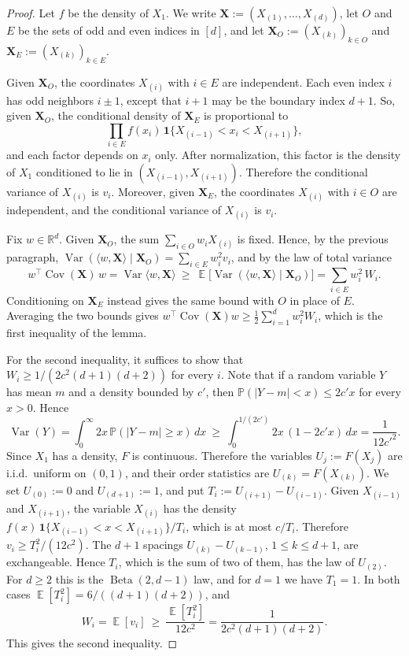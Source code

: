 \documentclass[11pt]{article}
\newcommand{\R}{\mathbb{R}}
\newcommand{\inner}[2]{\langle #1, #2 \rangle}
\theoremstyle{definition}
\DeclareMathOperator{\EX}{\mathbb{E}}
\DeclareMathOperator{\Cov}{Cov}
\begin{document}
\begin{proof}
	Let $f$ be the density of $X_1$. We write $\mathbf X:=(X_{(1)},\dots,X_{(d)})$, let $O$ and
	$E$ be the sets of odd and even indices in $[d]$, and let
	$\mathbf X_O:=(X_{(k)})_{k\in O}$ and $\mathbf X_E:=(X_{(k)})_{k\in E}$.

	Given $\mathbf X_O$, the coordinates $X_{(i)}$ with $i\in E$ are independent.  Each even index $i$
has odd neighbors $i\pm1$, except that $i+1$ may be the boundary index $d+1$. So,
given $\mathbf X_O$, the conditional density of $\mathbf X_E$ is proportional to
\[
\prod_{i\in E} f(x_i)\,\mathbf 1\bigl\{X_{(i-1)}<x_i<X_{(i+1)}\bigr\},
\]
and each factor depends on $x_i$ only. After normalization, this factor is
the density of $X_1$ conditioned to lie in $(X_{(i-1)},X_{(i+1)})$. Therefore the conditional variance of $X_{(i)}$ is $v_i$. Moreover, given $\mathbf X_E$, the coordinates $X_{(i)}$ with $i\in O$ are
independent, and the conditional variance of $X_{(i)}$ is $v_i$.

	 Fix $w\in\R^d$. Given $\mathbf X_O$, the sum
	$\sum_{i\in O}w_iX_{(i)}$ is fixed. Hence, by the previous paragraph,
	$\operatorname{Var}(\inner{w}{\mathbf X}\mid\mathbf X_O)=\sum_{i\in E}w_i^2v_i$, and by
	the law of total variance
	\[
	w^{\!\top}\Cov(\mathbf X)\,w=\operatorname{Var}\inner{w}{\mathbf X}
	\ \ge\ \EX\bigl[\operatorname{Var}(\inner{w}{\mathbf X}\mid \mathbf X_O)\bigr]
	=\sum_{i\in E}w_i^2\,W_i .
	\]
	Conditioning on $\mathbf X_E$ instead gives the same bound with $O$ in place of $E$.
	Averaging the two bounds gives
	$w^{\!\top}\Cov(\mathbf X)w\ge\tfrac12\sum_{i=1}^dw_i^2W_i$, which is the first
	inequality of the lemma.

	For the second inequality, it suffices to show that $W_i\ge1/(2c^2(d+1)(d+2))$ for
every $i$. Note that if a random variable $Y$ has mean $m$ and a density
bounded by $c'$, then $\mathbb P(|Y-m|<x)\le2c'x$ for every $x>0$. Hence
\[
\operatorname{Var}(Y)=\int_0^\infty2x\,\mathbb P(|Y-m|\ge x)\,dx
\ \ge\ \int_0^{1/(2c')}2x\,(1-2c'x)\,dx=\frac{1}{12c'^2}.
\]
Since $X_1$ has a density, $F$ is continuous. Therefore the variables $U_j:=F(X_j)$ are i.i.d.\
uniform on $(0,1)$, and their order statistics are $U_{(k)}=F(X_{(k)})$. We set
$U_{(0)}:=0$ and $U_{(d+1)}:=1$, and put $T_i:=U_{(i+1)}-U_{(i-1)}$. Given $X_{(i-1)}$ and
$X_{(i+1)}$, the variable $X_{(i)}$ has the density
$f(x)\,\mathbf 1\{X_{(i-1)}<x<X_{(i+1)}\}/T_i$, which is at most $c/T_i$. Therefore
$v_i\ge T_i^2/(12c^2)$. The $d+1$ spacings $U_{(k)}-U_{(k-1)}$, $1\le k\le d+1$, are exchangeable. Hence $T_i$, which is the sum of two of them, has the law of $U_{(2)}$. For $d\ge2$ this is the
$\operatorname{Beta}(2,d-1)$ law, and for $d=1$ we have $T_1=1$. In both cases
$\EX[T_i^2]=6/((d+1)(d+2))$, and
\[
W_i=\EX[v_i]\ \ge\ \frac{\EX[T_i^{2}]}{12c^{2}}=\frac{1}{2c^{2}(d+1)(d+2)} .
\]
 This gives the second inequality.
\end{proof}
\end{document}
